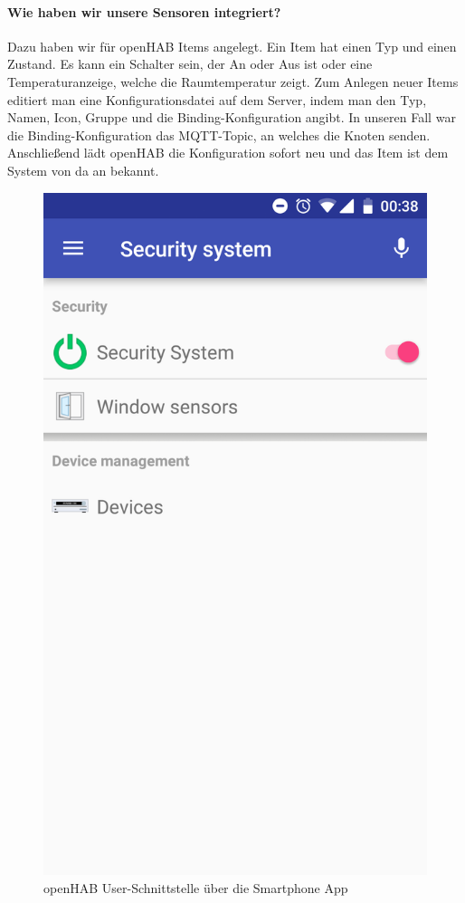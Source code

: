 \documentclass[a4paper,10pt,twocolumn]{article}
\begin{document}
\paragraph{Wie haben wir unsere Sensoren integriert?} Dazu haben wir für openHAB Items angelegt. Ein Item hat einen Typ und einen Zustand. Es kann ein Schalter sein, der An oder Aus ist oder eine Temperaturanzeige, welche die Raumtemperatur zeigt. Zum Anlegen neuer Items editiert man eine Konfigurationsdatei auf dem Server, indem man den Typ, Namen, Icon, Gruppe und die Binding-Konfiguration angibt. In unseren Fall war die Binding-Konfiguration das \ac{MQTT}-Topic, an welches die Knoten senden. Anschließend lädt openHAB die Konfiguration sofort neu und das Item ist dem System von da an bekannt.

\begin{figure}[htb!]
\centering
\includegraphics[width = (\textwidth)/3]{images/openhab_app.png}
\caption{openHAB User-Schnittstelle über die Smartphone App}
\label{fig:openhab_app}
\end{figure}
\end{document}

